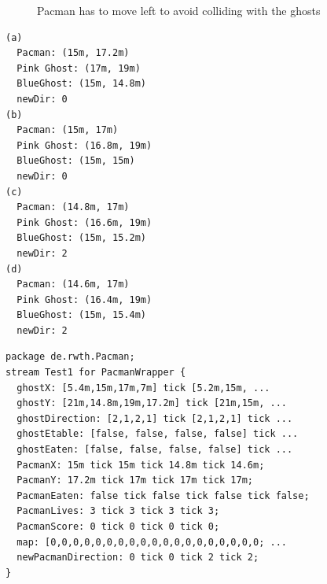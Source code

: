 \begin{figure}[!h]
	\caption{Pacman has to move left to avoid colliding with the ghosts} 
	\label{fig:PacmanFleeing}
\end{figure}
\begin{lstlisting}[caption={Values for the stream test},label=lst:pmStreamValues, frame=single]
(a)
  Pacman: (15m, 17.2m) 
  Pink Ghost: (17m, 19m) 
  BlueGhost: (15m, 14.8m) 
  newDir: 0
(b)	
  Pacman: (15m, 17m) 
  Pink Ghost: (16.8m, 19m) 
  BlueGhost: (15m, 15m) 
  newDir: 0
(c)	
  Pacman: (14.8m, 17m) 
  Pink Ghost: (16.6m, 19m) 
  BlueGhost: (15m, 15.2m) 
  newDir: 2
(d)	
  Pacman: (14.6m, 17m) 
  Pink Ghost: (16.4m, 19m)
  BlueGhost: (15m, 15.4m)
  newDir: 2
\end{lstlisting}

\begin{lstlisting}[caption={Stream test for the scenario above},label=lst:pmStreamTest, frame=single, morekeywords={tick, stream, for, package}]
package de.rwth.Pacman;
stream Test1 for PacmanWrapper {
  ghostX: [5.4m,15m,17m,7m] tick [5.2m,15m, ...
  ghostY: [21m,14.8m,19m,17.2m] tick [21m,15m, ...
  ghostDirection: [2,1,2,1] tick [2,1,2,1] tick ...
  ghostEtable: [false, false, false, false] tick ...
  ghostEaten: [false, false, false, false] tick ...
  PacmanX: 15m tick 15m tick 14.8m tick 14.6m;
  PacmanY: 17.2m tick 17m tick 17m tick 17m;
  PacmanEaten: false tick false tick false tick false;
  PacmanLives: 3 tick 3 tick 3 tick 3;
  PacmanScore: 0 tick 0 tick 0 tick 0;
  map: [0,0,0,0,0,0,0,0,0,0,0,0,0,0,0,0,0,0,0; ...
  newPacmanDirection: 0 tick 0 tick 2 tick 2;
}
\end{lstlisting}

